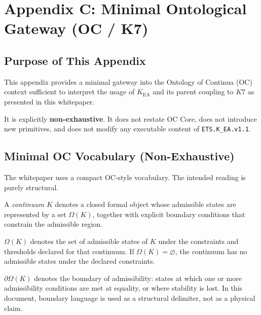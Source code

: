 
\section*{Appendix C: Minimal Ontological Gateway (OC / K7)}

\subsection*{Purpose of This Appendix}

This appendix provides a minimal gateway into the Ontology of Continua
(OC) context sufficient to interpret the usage of $K_{\mathrm{EA}}$ and
its parent coupling to $K7$ as presented in this whitepaper.

It is explicitly \textbf{non-exhaustive}. It does not restate OC Core,
does not introduce new primitives, and does not modify any executable
content of \texttt{ETS.K\_EA.v1.1}.

\subsection*{Minimal OC Vocabulary (Non-Exhaustive)}

The whitepaper uses a compact OC-style vocabulary. The intended reading
is purely structural.

\begin{definition}[Continuum]
A \emph{continuum} $K$ denotes a closed formal object whose admissible
states are represented by a set $\Omega(K)$, together with explicit
boundary conditions that constrain the admissible region.
\end{definition}

\begin{definition}
$\Omega(K)$ denotes the set of admissible states of $K$ under the
constraints and thresholds declared for that continuum. If
$\Omega(K)=\varnothing$, the continuum has no admissible states under the
declared constraints.
\end{definition}

\begin{definition}[Boundary]
$\partial \Omega(K)$ denotes the boundary of admissibility: states at
which one or more admissibility conditions are met at equality, or where
stability is lost. In this document, boundary language is used as a
structural delimiter, not as a physical claim.
\end{definition}

